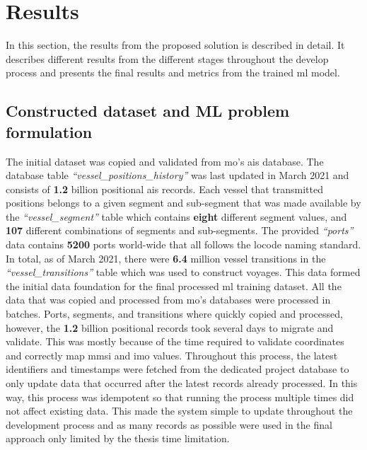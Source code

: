 \chapter{Results}
\label{chap:results}

In this section, the results from the proposed solution is described in detail. It describes different results from the different stages throughout the develop process and presents the final results and metrics from the trained \acrfull{ml} model.

\section{Constructed dataset and ML problem formulation}

The initial dataset was copied and validated from \acrfull{mo}'s \acrshort{ais} database. The database table \textit{``vessel\_positions\_history''} was last updated in March 2021 and consists of \textbf{1.2} billion positional \acrshort{ais} records. Each vessel that transmitted positions belongs to a given segment and sub-segment that was made available by the \textit{``vessel\_segment''} table which contains \textbf{eight} different segment values, and \textbf{107} different combinations of segments and sub-segments. The provided \textit{``ports''} data contains \textbf{5200} ports world-wide that all follows the \gls{locode} naming standard. In total, as of March 2021, there were \textbf{6.4} million vessel transitions in the \textit{``vessel\_transitions''} table which was used to construct voyages. This data formed the initial data foundation for the final processed \acrfull{ml} training dataset. All the data that was copied and processed from \acrshort{mo}'s databases were processed in batches. Ports, segments, and transitions where quickly copied and processed, however, the \textbf{1.2} billion positional records took several days to migrate and validate. This was mostly because of the time required to validate coordinates and correctly map \acrshort{mmsi} and \acrshort{imo} values. Throughout this process, the latest identifiers and timestamps were fetched from the dedicated project database to only update data that occurred after the latest records already processed. In this way, this process was idempotent so that running the process multiple times did not affect existing data. This made the system simple to update throughout the development process and as many records as possible were used in the final approach only limited by the thesis time limitation.

